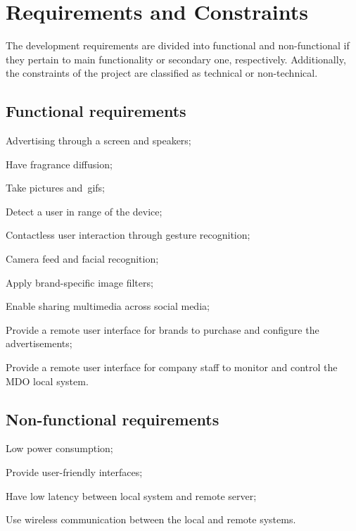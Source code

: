 \section{Requirements and Constraints}
\label{sec:req-const}
%
The development requirements are divided into functional and non-functional if they pertain to main functionality or secondary one, respectively. Additionally, the constraints of the project are classified as technical or non-technical.

\subsection{Functional requirements}
\label{sec:funct-requ}
%
\begin{item-c}
\item Advertising through a screen and speakers;
\item Have fragrance diffusion;
\item Take pictures and~\gls{gif}s;
\item Detect a user in range of the device;
\item Contactless user interaction through gesture recognition;
\item Camera feed and facial recognition;
\item Apply brand-specific image filters;
\item Enable sharing multimedia across social media;
\item Provide a remote user interface for brands to purchase and configure the advertisements;
\item Provide a remote user interface for company staff to monitor and control
  the MDO local system.
\end{item-c}
%
\subsection{Non-functional requirements}
\label{sec:non-funct-requ}
%
\begin{item-c}
\item Low power consumption;
\item Provide user-friendly interfaces;
\item Have low latency between local system and remote server;
\item Use wireless communication between the local and remote systems.
\end{item-c}
%
